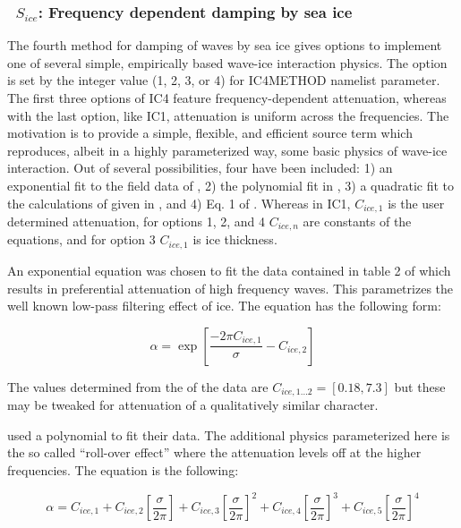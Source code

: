 \vsssub
\subsubsection{~$S_{ice}$: Frequency dependent damping by sea ice} \label{sec:ICE4}
\vsssub


\noindent
The fourth method for damping of waves by sea ice gives options to implement one of several simple, empirically based wave-ice interaction physics. The option is set by the integer value (1, 2, 3, or 4) for {\code IC4METHOD} namelist parameter. The first three options of {\code IC4} feature frequency-dependent attenuation, whereas with the last option, like {\code IC1}, attenuation is uniform across the frequencies. The motivation is to provide a simple, flexible, and efficient source term which reproduces, albeit in a highly parameterized way, some basic physics of wave-ice interaction. Out of several possibilities, four have been included: 1) an exponential fit to the field data of \cite{art:WAD88}, 2) the polynomial fit in \cite{art:MBK14}, 3) a quadratic fit to the calculations of \cite{art:KM08} given in \cite{art:HT15}, and 4) Eq. 1 of \cite{art:Ko14}. Whereas in {\code IC1}, ${C_{ice,1}}$ is the user determined attenuation, for options 1, 2, and 4 ${C_{ice,n}}$ are constants of the equations, and for option 3 ${C_{ice,1}}$ is ice thickness. 

An exponential equation was chosen to fit the data contained in table 2 of \cite{art:WAD88} which results in preferential attenuation of high frequency waves. This parametrizes the well known low-pass filtering effect of ice. The equation has the following form:

\begin{equation}\label{eq:ice1}
  {\alpha} = \exp[\frac{-{2\pi}C_{ice, 1}}{{\sigma}} - C_{ice, 2}]
\end{equation}

\noindent
The values determined from the of the data are ${C_{ice,1...2}}=[0.18, 7.3]$ but these may be tweaked for attenuation of a qualitatively similar character. 

\cite{art:MBK14} used a polynomial to fit their data. The additional physics parameterized here is the so called “roll-over effect” where the attenuation levels off at the higher frequencies. The equation is the following:

\begin{equation}\label{eq:ice2}
  {\alpha} = C_{ice,1} + C_{ice,2}[{\frac{\sigma}{2\pi}}] + C_{ice,3}[{\frac{\sigma}{2\pi}}]^2 + C_{ice,4}[{\frac{\sigma}{2\pi}}]^3 + C_{ice,5}[{\frac{\sigma}{2\pi}}]^4
\end{equation}

